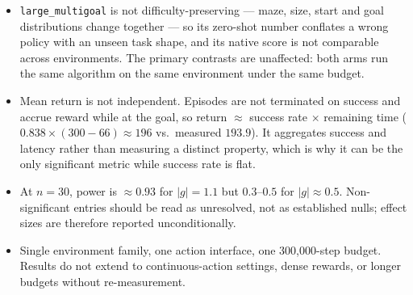 \begin{itemize}
  \item \texttt{large\_multigoal} is not difficulty-preserving --- maze, size, start and goal distributions change together --- so its zero-shot number conflates a wrong policy with an unseen task shape, and its native score is not comparable across environments. The primary contrasts are unaffected: both arms run the same algorithm on the same environment under the same budget.
  \item Mean return is not independent. Episodes are not terminated on success and accrue reward while at the goal, so return $\approx$ success rate $\times$ remaining time ($0.838\times(300-66)\approx196$ vs.\ measured $193.9$). It aggregates success and latency rather than measuring a distinct property, which is why it can be the only significant metric while success rate is flat.
  \item At $n=30$, power is $\approx0.93$ for $|g|=1.1$ but $0.3$--$0.5$ for $|g|\approx0.5$. Non-significant entries should be read as unresolved, not as established nulls; effect sizes are therefore reported unconditionally.
  \item Single environment family, one action interface, one 300,000-step budget. Results do not extend to continuous-action settings, dense rewards, or longer budgets without re-measurement.
\end{itemize}
